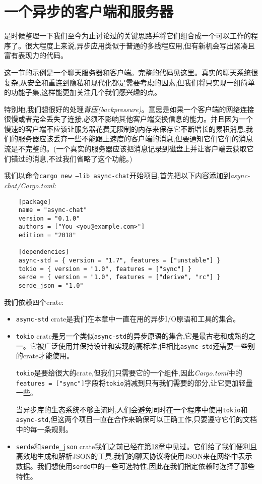 \section{一个异步的客户端和服务器}
是时候整理一下我们至今为止讨论过的关键思路并将它们组合成一个可以工作的程序了。很大程度上来说,异步应用类似于普通的多线程应用,但有新机会写出紧凑且富有表现力的代码。

这一节的示例是一个聊天服务器和客户端。\href{https://github.com/ProgrammingRust/async-chat}{完整的代码}见这里。真实的聊天系统很复杂,从安全和重连到隐私和现代化都是需要考虑的因素,但我们将只实现一组简单的功能子集,这样能更加关注几个我们感兴趣的点。

特别地,我们想很好的处理\emph{背压(backpressure)}。意思是如果一个客户端的网络连接很慢或者完全丢失了连接,必须不影响其他客户端交换信息的能力。并且因为一个慢速的客户端不应该让服务器花费无限制的内存来保存它不断增长的累积消息,我们的服务器应该丢弃一些不能跟上速度的客户端的消息,但要通知它们它们的消息流是不完整的。(一个真实的服务器应该把消息记录到磁盘上并让客户端去获取它们错过的消息,不过我们省略了这个功能。)

我们以命令\texttt{cargo new --lib async-chat}开始项目,首先把以下内容添加到\emph{async-chat/Cargo.toml}:
\begin{verbatim}
    [package]
    name = "async-chat"
    version = "0.1.0"
    authors = ["You <you@example.com>"]
    edition = "2018"

    [dependencies]
    async-std = { version = "1.7", features = ["unstable"] }
    tokio = { version = "1.0", features = ["sync"] }
    serde = { version = "1.0", features = ["derive", "rc"] }
    serde_json = "1.0"
\end{verbatim}

我们依赖四个crate:
\begin{itemize}
    \item \texttt{async-std} crate是我们在本章中一直在用的异步I/O原语和工具的集合。
    \item \texttt{tokio} crate是另一个类似\texttt{async-std}的异步原语的集合,它是最古老和成熟的之一。它被广泛使用并保持设计和实现的高标准,但相比\texttt{async-std}还需要一些别的crate才能使用。
    
    \texttt{tokio}是要给很大的crate,但我们只需要它的一个组件,因此\emph{Cargo.toml}中的\texttt{features = ["sync"]}字段将\texttt{tokio}消减到只有我们需要的部分,让它更加轻量一些。

    当异步库的生态系统不够主流时,人们会避免同时在一个程序中使用\texttt{tokio}和\texttt{async-std},但这两个项目一直在合作来确保可以正确工作,只要遵守它们的文档中的每一条规则。
    \item \texttt{serde}和\texttt{serde\_json} crate我们之前已经在\hyperref[ch18]{第18章}中见过。它们给了我们便利且高效地生成和解析JSON的工具,我们的聊天协议将使用JSON来在网络中表示数据。我们想使用\texttt{serde}中的一些可选特性,因此在我们指定依赖时选择了那些特性。
\end{itemize}

